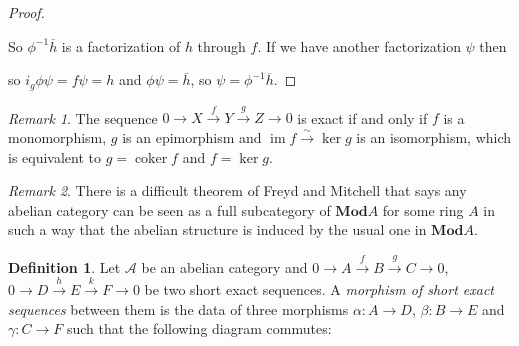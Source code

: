 \documentclass{article}
\newcommand{\Acat}{\mathcal{A}}
\newcommand{\Mod}{\mathbf{Mod}}
\DeclareMathOperator{\coker}{coker}
\DeclareMathOperator{\im}{im}
\theoremstyle{plain}
\theoremstyle{definition}
\newtheorem{definition}[theorem]{Definition}
\theoremstyle{remark}
\newtheorem*{remark}{Remark}
\begin{document}
\begin{proof}
\begin{center}
    \end{center}
    So $\phi^{-1} \overline{h}$ is a factorization of $h$ through $f$. If we have another factorization $\psi$ then
    \begin{center}
    \end{center}
    so $i_g \phi \psi = f \psi = h$ and $\phi \psi = \overline{h}$, so $\psi = \phi^{-1} \overline{h}$.
\end{proof}

\begin{remark}
    The sequence $0 \to X \xrightarrow{f} Y \xrightarrow{g} Z \to 0$ is exact if and only if $f$ is a monomorphism, $g$ is an epimorphism and $\im f \xrightarrow{\sim} \ker g$ is an isomorphism, which is equivalent to $g = \coker f$ and $f = \ker g$.
\end{remark}

\begin{remark}
    There is a difficult theorem of Freyd and Mitchell that says any abelian category can be seen as a full subcategory of $\Mod A$ for some ring $A$ in such a way that the abelian structure is induced by the usual one in $\Mod A$.
\end{remark}

\begin{definition}
    Let $\Acat$ be an abelian category and $0 \to A \xrightarrow{f} B \xrightarrow{g} C \to 0$, $0 \to D \xrightarrow{h} E \xrightarrow{k} F \to 0$ be two short exact sequences. A \emph{morphism of short exact sequences} between them is the data of three morphisms $\alpha : A \to D$, $\beta : B\to E$ and $\gamma : C \to F$ such that the following diagram commutes:
    \begin{center}
    \end{center}
\end{definition}
\end{document}
